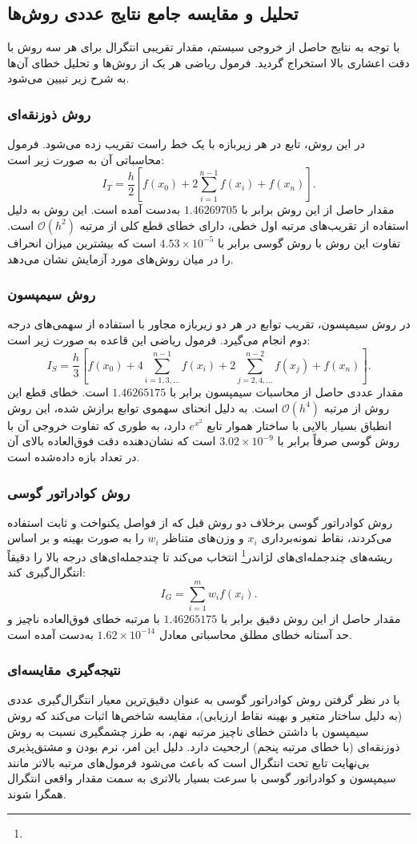 \subsection{تحلیل و مقایسه جامع نتایج عددی روش‌ها}
با توجه به نتایج حاصل از خروجی سیستم، مقدار تقریبی انتگرال برای هر سه روش با دقت اعشاری بالا استخراج گردید. فرمول ریاضی هر یک از روش‌ها و تحلیل خطای آن‌ها به شرح زیر تبیین می‌شود.

\subsubsection{روش ذوزنقه‌ای}
در این روش، تابع در هر زیربازه با یک خط راست تقریب زده می‌شود. فرمول محاسباتی آن به صورت زیر است:
\[
I_T = \frac{h}{2} \left[ f(x_0) + 2\sum_{i=1}^{n-1} f(x_i) + f(x_n) \right].
\]
مقدار حاصل از این روش برابر با $ 1.46269705 $ به‌دست آمده است. این روش به دلیل استفاده از تقریب‌های مرتبه اول خطی، دارای خطای قطع کلی از مرتبه $ \mathcal{O}(h^2) $ است. تفاوت این روش با روش گوسی برابر با $ 4.53 \times 10^{-5} $ است که بیشترین میزان انحراف را در میان روش‌های مورد آزمایش نشان می‌دهد.

\subsubsection{روش سیمپسون}
در روش سیمپسون، تقریب توابع در هر دو زیربازه مجاور با استفاده از سهمی‌های درجه دوم انجام می‌گیرد. فرمول ریاضی این قاعده به صورت زیر است:
\[
I_S = \frac{h}{3} \left[ f(x_0) + 4\sum_{i=1,3,\dots}^{n-1} f(x_i) + 2\sum_{j=2,4,\dots}^{n-2} f(x_j) + f(x_n) \right].
\]
مقدار عددی حاصل از محاسبات سیمپسون برابر با $ 1.46265175 $ است. خطای قطع این روش از مرتبه $ \mathcal{O}(h^4) $ است. به دلیل انحنای سهموی توابع برازش شده، این روش انطباق بسیار بالایی با ساختار هموار تابع $ e^{x^2} $ دارد، به طوری که تفاوت خروجی آن با روش گوسی صرفاً برابر با $ 3.02 \times 10^{-9} $ است که نشان‌دهنده دقت فوق‌العاده بالای آن در تعداد بازه داده‌شده است.

\subsubsection{روش کوادراتور گوسی}
روش کوادراتور گوسی برخلاف دو روش قبل که از فواصل یکنواخت و ثابت استفاده می‌کردند، نقاط نمونه‌برداری $ x_i $ و وزن‌های متناظر $ w_i $ را به صورت بهینه و بر اساس ریشه‌های چندجمله‌ای‌های لژاندر\footnote{} انتخاب می‌کند تا چندجمله‌ای‌های درجه بالا را دقیقاً انتگرال‌گیری کند:
\[
I_G = \sum_{i=1}^{m} w_i f(x_i).
\]
مقدار حاصل از این روش دقیق برابر با $ 1.46265175 $ با مرتبه خطای فوق‌العاده ناچیز و حد آستانه خطای مطلق محاسباتی معادل $ 1.62 \times 10^{-14} $ به‌دست آمده است. 

\subsubsection{نتیجه‌گیری مقایسه‌ای}
با در نظر گرفتن روش کوادراتور گوسی به عنوان دقیق‌ترین معیار انتگرال‌گیری عددی (به دلیل ساختار متغیر و بهینه نقاط ارزیابی)، مقایسه شاخص‌ها اثبات می‌کند که روش سیمپسون با داشتن خطای ناچیز مرتبه نهم، به طرز چشمگیری نسبت به روش ذوزنقه‌ای (با خطای مرتبه پنجم) ارجحیت دارد. دلیل این امر، نرم بودن و مشتق‌پذیری بی‌نهایت تابع تحت انتگرال است که باعث می‌شود فرمول‌های مرتبه بالاتر مانند سیمپسون و کوادراتور گوسی با سرعت بسیار بالاتری به سمت مقدار واقعی انتگرال همگرا شوند.
